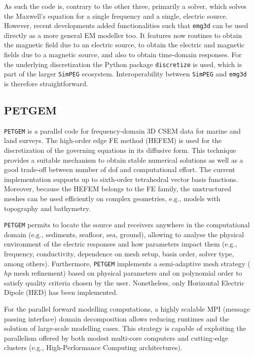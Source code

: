 \documentclass[
    paper,
  ]{geophysics}
\newcommand{\emg}[2]{\texttt{emg#1#2}\xspace}
\newcommand{\simpeg}{\texttt{SimPEG}\xspace}
\newcommand{\discretize}{\texttt{discretize}\xspace}
\newcommand{\petgem}{\texttt{PETGEM}\xspace}
\begin{document}
As such the code is, contrary to the other three, primarily a solver, which solves the Maxwell's equation for a single frequency and a single, electric source. However, recent developments added functionalities such that \emg3d can be used directly as a more general EM modeller too. It features now routines to obtain the magnetic field due to an electric source, to obtain the electric and magnetic fields due to a magnetic source, and also to obtain time-domain responses. For the underlying discretization the Python package \discretize is used, which is part of the larger \simpeg ecosystem. Interoperability between \simpeg and \emg3d is therefore straightforward.

\subsection{PETGEM}

\petgem is a parallel code for frequency-domain 3D CSEM data for marine and land surveys. The high-order edge FE method (HEFEM) is used for the discretization of the governing equations in its diffusive form. This technique provides a suitable mechanism to obtain stable numerical solutions as well as a good trade-off between number of dof and computational effort. The current implementation supports up to sixth-order tetrahedral vector basis functions. Moreover, because the HEFEM belongs to the FE family, the unstructured meshes can be used efficiently on complex geometries, e.g., models with topography and bathymetry.

\petgem permits to locate the source and receivers anywhere in the computational domain (e.g., sediments, seafloor, sea, ground), allowing to analyse the physical environment of the electric responses and how parameters impact them (e.g., frequency, conductivity, dependence on mesh setup, basis order, solver type, among others). Furthermore, \petgem implements a semi-adaptive mesh strategy ($hp$ mesh refinement) based on physical parameters and on polynomial order to satisfy quality criteria chosen by the user. Nonetheless, only Horizontal Electric Dipole (HED) has been implemented.

For the parallel forward modelling computations, a highly scalable MPI (message passing interface) domain decomposition allows reducing runtimes and the solution of large-scale modelling cases. This strategy is capable of exploiting the parallelism offered by both modest multi-core computers and cutting-edge clusters (e.g., High-Performance Computing architectures).
\end{document}
